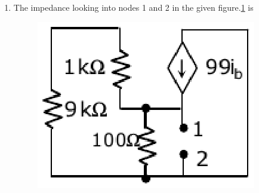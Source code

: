 \documentclass[journal,12pt,twocolumn]{IEEEtran}
\begin{document}
\begin{enumerate}
\item The impedance looking into nodes 1 and 2 in the given figure.\ref{fig85} is
\begin{enumerate}
\setlength\itemsep{2em}
\begin{figure}[!h]
\begin{center}
\includegraphics[scale=0.5]{./figs/fig85.eps}
\caption{}
\label{fig85}
\end{center}
\end{figure}
\end{enumerate}



\end{enumerate}
\end{document}
